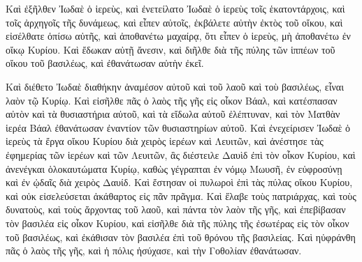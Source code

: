 {Καὶ ἐξῆλθεν Ἰωδαὲ ὁ ἱερεὺς, καὶ ἐνετείλατο Ἰωδαὲ ὁ ἱερεὺς τοῖς ἑκατοντάρχοις, καὶ τοῖς ἀρχηγοῖς τῆς δυνάμεως, καὶ εἶπεν αὐτοῖς, ἐκβάλετε αὐτὴν ἐκτὸς τοῦ οἴκου, καὶ εἰσέλθατε ὀπίσω αὐτῆς, καὶ ἀποθανέτω μαχαίρᾳ, ὅτι εἶπεν ὁ ἱερεὺς, μὴ ἀποθανέτω ἐν οἴκῳ Κυρίου.
Καὶ ἔδωκαν αὐτῇ ἄνεσιν, καὶ διῆλθε διὰ τῆς πύλης τῶν ἱππέων τοῦ οἴκου τοῦ βασιλέως, καὶ ἐθανάτωσαν αὐτὴν ἐκεῖ.
\par }{\PP {}Καὶ διέθετο Ἰωδαὲ διαθήκην ἀναμέσον αὐτοῦ καὶ τοῦ λαοῦ καὶ τοὺ βασιλέως, εἶναι λαὸν τῷ Κυρίῳ.
Καὶ εἰσῆλθε πᾶς ὁ λαὸς τῆς γῆς εἰς οἶκον Βάαλ, καὶ κατέσπασαν αὐτὸν καὶ τὰ θυσιαστήρια αὐτοῦ, καὶ τὰ εἴδωλα αὐτοῦ ἐλέπτυναν, καὶ τὸν Ματθὰν ἱερέα Βάαλ ἐθανάτωσαν ἐναντίον τῶν θυσιαστηρίων αὐτοῦ.
Καὶ ἐνεχείρισεν Ἰωδαὲ ὁ ἱερεὺς τὰ ἔργα οἴκου Κυρίου διὰ χειρὸς ἱερέων καὶ Λευιτῶν, καὶ ἀνέστησε τὰς ἐφημερίας τῶν ἱερέων καὶ τῶν Λευιτῶν, ἃς διέστειλε Δαυὶδ ἐπὶ τὸν οἶκον Κυρίου, καὶ ἀνενέγκαι ὁλοκαυτώματα Κυρίῳ, καθὼς γέγραπται ἐν νόμῳ Μωυσῆ, ἐν εὐφροσύνῃ καὶ ἐν ᾠδαῖς διὰ χειρὸς Δαυίδ.
Καὶ ἔστησαν οἱ πυλωροὶ ἐπὶ τὰς πύλας οἴκου Κυρίου, καὶ οὐκ εἰσελεύσεται ἀκάθαρτος εἰς πᾶν πρᾶγμα.
Καὶ ἔλαβε τοὺς πατριάρχας, καὶ τοὺς δυνατοὺς, καὶ τοὺς ἄρχοντας τοῦ λαοῦ, καὶ πάντα τὸν λαὸν τῆς γῆς, καὶ ἐπεβίβασαν τὸν βασιλέα εἰς οἶκον Κυρίου, καὶ εἰσῆλθε διὰ τῆς πύλης τῆς ἐσωτέρας εἰς τὸν οἶκον τοῦ βασιλέως, καὶ ἐκάθισαν τὸν βασιλέα ἐπὶ τοῦ θρόνου τῆς βασιλείας.
Καὶ ηὐφράνθη πᾶς ὁ λαὸς τῆς γῆς, καὶ ἡ πόλις ἡσύχασε, καὶ τὴν Γοθολίαν ἐθανάτωσαν.

}
